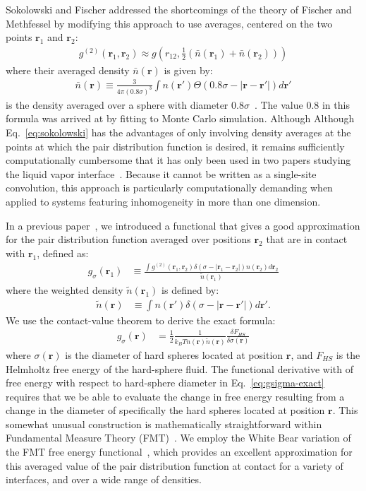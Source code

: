 \documentclass[letterpaper,twocolumn,amsmath,amssymb,pre,aps,10pt]{revtex4-1}
\newcommand{\rr}{\textbf{r}}
\begin{document}
Sokolowski and Fischer addressed the shortcomings of the theory of
Fischer and Methfessel by modifying this approach to use
averages, centered on the two points $\rr_1$ and $\rr_2$:
\begin{align}
  g^{(2)}(\rr_1,\rr_2) \approx g\left(r_{12},
  \tfrac12(\bar{n}(\rr_1)+\bar{n}(\rr_2))\right)
  \label{eq:sokolowski}
\end{align}
where their averaged density $\bar{n}(\rr)$ is given by:
\begin{align}
  \bar{n}(\rr) \equiv \frac{3}{4\pi (0.8\sigma)^3}\int n(\rr')\Theta(0.8\sigma - |\rr-\rr'|) d\rr'
\end{align}
is the density averaged over a sphere with diameter
$0.8\sigma$~\cite{sokolowski1992role}.  The value 0.8 in this formula
was arrived at by fitting to Monte Carlo simulation.  Although
Although Eq.~\ref{eq:sokolowski} has the advantages of only involving
density averages at the points at which the pair distribution function
is desired, it remains sufficiently computationally cumbersome that it
has only been used in two papers studying the liquid vapor
interface~\cite{wadewitz2000application, winkelmann2001liquid}.
Because it cannot be written as a single-site convolution, this
approach is particularly computationally demanding when applied to
systems featuring inhomogeneity in more than one dimension.

In a previous paper~\cite{schulte2012using}, we introduced a
functional that gives a good approximation for the pair distribution
function averaged over positions $\rr_2$ that are in contact with
$\rr_1$, defined as:
\begin{align}
  g_\sigma(\rr_1) &\equiv \frac{ \int g^{(2)}(\rr_1,\rr_2) \delta(\sigma -|\rr_1-\rr_2|)n(\rr_2)
    d\rr_2 }{ \tilde{n}(\rr_1)  }
\end{align}
where the weighted density $\tilde{n}(\rr_1)$ is defined by:
\begin{align}
  \tilde{n}(\rr) &\equiv \int n(\rr') \delta(\sigma -|\rr - \rr'|)d\rr'.
\end{align}
We use the contact-value theorem to derive the exact formula:
\begin{align}
  g_\sigma(\rr)%
  &= \frac12 \frac{1}{k_BT n(\rr) \tilde{n}(\rr)} \frac{\delta
    F_{HS}}{\delta \sigma(\mathbf{r})} \label{eq:gsigma-exact}
\end{align}
where $\sigma(\rr)$ is the diameter of hard spheres located at
position $\rr$, and $F_{HS}$ is the Helmholtz free energy of the
hard-sphere fluid.  The functional derivative with of free energy with
respect to hard-sphere diameter in Eq.~\ref{eq:gsigma-exact} requires
that we be able to evaluate the change in free energy resulting from a
change in the diameter of specifically the hard spheres located at
position $\rr$.  This somewhat unusual construction is mathematically
straightforward within Fundamental Measure Theory
(FMT)~\cite{rosenfeld1989free}.  We employ the White Bear variation of
the FMT free energy functional~\cite{roth2002whitebear}, which
provides an excellent approximation for this averaged value of the
pair distribution function at contact for a variety of interfaces, and
over a wide range of densities.
\end{document}
